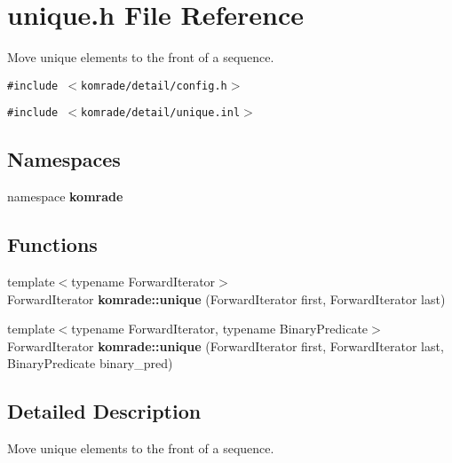 \section{unique.h File Reference}
\label{unique_8h}
Move unique elements to the front of a sequence. 

{\tt \#include $<$komrade/detail/config.h$>$}\par
{\tt \#include $<$komrade/detail/unique.inl$>$}\par
\subsection*{Namespaces}
\begin{CompactItemize}
\item 
namespace {\bf komrade}
\end{CompactItemize}
\subsection*{Functions}
\begin{CompactItemize}
\item 
{\footnotesize template$<$typename ForwardIterator$>$ }\\ForwardIterator {\bf komrade::unique} (ForwardIterator first, ForwardIterator last)
\item 
{\footnotesize template$<$typename ForwardIterator, typename BinaryPredicate$>$ }\\ForwardIterator {\bf komrade::unique} (ForwardIterator first, ForwardIterator last, BinaryPredicate binary\_\-pred)
\end{CompactItemize}


\subsection{Detailed Description}
Move unique elements to the front of a sequence. 

